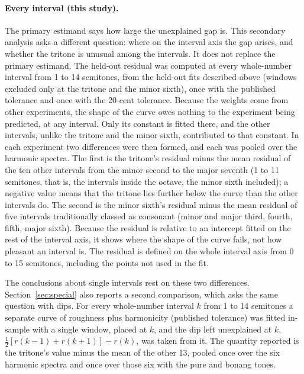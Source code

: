 \documentclass[11pt,a4paper]{article}
\begin{document}
\paragraph{Every interval (this study).}
The primary estimand says how large the unexplained gap is. This secondary analysis asks a
different question: where on the interval axis the gap arises, and whether the tritone is
unusual among the intervals. It does not replace the primary estimand. The held-out residual
was computed at every whole-number interval from 1 to 14 semitones, from the held-out fits described above (windows
excluded only at the tritone and the minor sixth), once with the published tolerance and once
with the 20-cent tolerance. Because the weights come from other
experiments, the shape of the curve owes nothing to the experiment being predicted, at any
interval. Only its constant is fitted there, and the other intervals, unlike the tritone and
the minor sixth, contributed to that constant. In each experiment two differences were then
formed, and each was pooled over the harmonic spectra. The first is the tritone's residual
minus the mean residual of the ten other intervals from the minor second to the major seventh
(1 to 11 semitones, that is, the intervals inside the octave, the minor sixth included); a negative value means that the tritone lies
further below the curve than the other intervals do. The second is the minor sixth's residual
minus the mean residual of five intervals traditionally classed as consonant (minor and major
third, fourth, fifth, major sixth). Because the residual is relative to an intercept fitted
on the rest of the interval axis, it shows where the shape of the curve fails, not how
pleasant an interval is.  The residual is defined on the whole
interval axis from 0 to 15 semitones, including the points not used in the fit.

The conclusions about single intervals rest on these two differences. Section~\ref{sec:special}
also reports a second comparison, which asks the same question with dips. For every whole-number interval $k$ from 1 to 14
semitones a separate curve of roughness plus harmonicity (published tolerance) was fitted
in-sample with a single window, placed at $k$, and the dip left unexplained at $k$,
$\tfrac12[r(k-1)+r(k+1)]-r(k)$, was taken from it. The quantity reported is the tritone's
value minus the mean of the other 13, pooled once over the six harmonic spectra and once
over those six with the pure and bonang tones.
\end{document}
